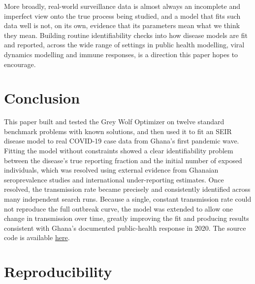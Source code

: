 \documentclass[journal]{IEEEtran}
\begin{document}

More broadly, real-world surveillance data is almost always an incomplete and imperfect view onto the true process being studied, and a model that fits such data well is not, on its own, evidence that its parameters mean what we think they mean. Building routine identifiability checks into how disease models are fit and reported, across the wide range of settings in public health modelling, viral dynamics modelling and immune responses, is a direction this paper hopes to encourage.

\section{Conclusion}

This paper built and tested the Grey Wolf Optimizer on twelve standard benchmark problems with known solutions, and then used it to fit an SEIR disease model to real COVID-19 case data from Ghana's first pandemic wave. Fitting the model without constraints showed a clear identifiability problem between the disease's true reporting fraction and the initial number of exposed individuals, which was resolved using external evidence from Ghanaian seroprevalence studies and international under-reporting estimates. Once resolved, the transmission rate became precisely and
consistently identified across many independent search runs. Because a single, constant transmission rate could not reproduce the full outbreak curve, the model was extended to allow one change in transmission over time, greatly improving the fit and producing results consistent with Ghana's documented public-health response in 2020. The source code is available \href{https://github.com/Frank-Anokye/gwo-seir-identifiability}{here}.




\iffalse
\section*{Reproducibility}
\end{document}
